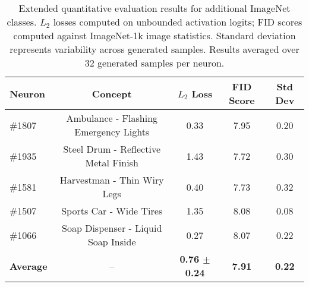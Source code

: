 \begin{table}[ht!]
\centering
\begin{tabular}{lcccc}
\toprule
\textbf{Neuron} & \textbf{Concept} & \textbf{$L_2$ Loss} & \textbf{FID Score} & \textbf{Std Dev} \\
\midrule
\#1807 & Ambulance - Flashing Emergency Lights & 0.33 & 7.95 & 0.20 \\
\#1935 & Steel Drum - Reflective Metal Finish & 1.43 & 7.72 & 0.30 \\
\#1581 & Harvestman - Thin Wiry Legs & 0.40 & 7.73 & 0.32 \\
\#1507 & Sports Car - Wide Tires & 1.35 & 8.08 & 0.08 \\
\#1066 & Soap Dispenser - Liquid Soap Inside & 0.27 & 8.07 & 0.22 \\
\midrule
\textbf{Average} & -- & \textbf{0.76 $\pm$ 0.24} & \textbf{7.91} & \textbf{0.22} \\
\bottomrule
\end{tabular}
\caption{Extended quantitative evaluation results for additional ImageNet classes. $L_2$ losses computed on unbounded activation logits; FID scores computed against ImageNet-1k image statistics. Standard deviation represents variability across generated samples. Results averaged over 32 generated samples per neuron.}
\label{tab:appendix_results}
\end{table}

\clearpage
